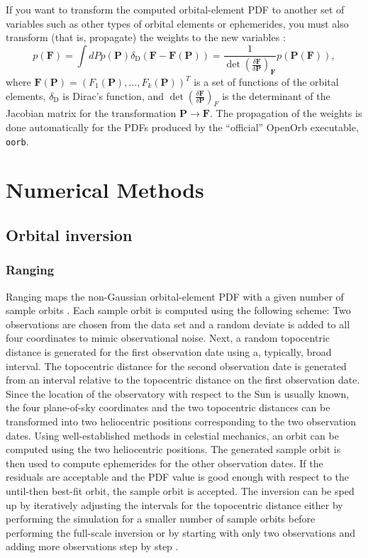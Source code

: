 \documentclass[12pt,english,twoside,a4paper]{report}
\begin{document}
If you want to transform the computed orbital-element PDF to
another set of variables such as other types of orbital elements or
ephemerides, you must also transform (that is, propagate) the weights
to the new variables \cite{mui1993a}:
\begin{equation}
p(\mathbf{F}) = \int dP p(\mathbf{P})\delta_\mathrm{D}
(\mathbf{F}-\mathbf{F}(\mathbf{P})) = \frac{1}{\det(\frac{\delta
    \mathbf{F}}{\delta \mathbf{P}})_\mathbf{F}}
p(\mathbf{P}(\mathbf{F})),
\end{equation}
where
$\mathbf{F}(\mathbf{P})=(F_1(\mathbf{P}),\ldots,F_k(\mathbf{P}))^T$ is
a set of functions of the orbital elements, $\delta_\mathrm{D}$ is
Dirac's function, and $\det(\frac{\delta \mathbf{F}}{\delta
  \mathbf{P}})_F$ is the determinant of the Jacobian matrix for the
transformation $\mathbf{P} \rightarrow \mathbf{F}$. The propagation of
the weights is done automatically for the PDFs produced by the
``official'' OpenOrb executable, \verb|oorb|.



\section{Numerical Methods} 

\subsection{Orbital inversion}

\subsubsection{Ranging}

Ranging maps the non-Gaussian orbital-element PDF with a given
number of sample orbits \cite{vir2001a,mui2001a}. Each sample orbit is
computed using the following scheme: Two observations are chosen from
the data set and a random deviate is added to all four coordinates to
mimic observational noise. Next, a random topocentric distance is
generated for the first observation date using a, typically, broad
interval. The topocentric distance for the second observation date is
generated from an interval relative to the topocentric distance on the
first observation date. Since the location of the observatory with
respect to the Sun is usually known, the four plane-of-sky coordinates
and the two topocentric distances can be transformed into two
heliocentric positions corresponding to the two observation
dates. Using well-established methods in celestial mechanics, an orbit
can be computed using the two heliocentric positions. The generated
sample orbit is then used to compute ephemerides for the other
observation dates. If the residuals are acceptable and the
PDF value is good enough with respect to the until-then best-fit
orbit, the sample orbit is accepted. The inversion can be sped up by
iteratively adjusting the intervals for the topocentric distance
either by performing the simulation for a smaller number of sample
orbits before performing the full-scale inversion \cite{vir2003a} or
by starting with only two observations and adding more observations
step by step \cite{gra2005c}.
\end{document}
